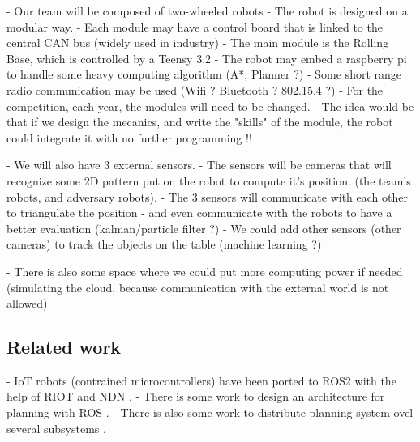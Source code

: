  - Our team will be composed of two-wheeled robots
 - The robot is designed on a modular way.
 - Each module may have a control board that is linked to the central CAN bus (widely used in industry)
 - The main module is the Rolling Base, which is controlled by a Teensy 3.2
 - The robot may embed a raspberry pi to handle some heavy computing algorithm (A*, Planner ?)
 - Some short range radio communication may be used (Wifi ? Bluetooth ? 802.15.4 ?)
 - For the competition, each year, the modules will need to be changed.
 - The idea would be that if we design the mecanics, and write the "skills" of the module, the robot could integrate it with no further programming !!

 - We will also have 3 external sensors.
 - The sensors will be cameras that will recognize some 2D pattern put on the robot to compute it's position. (the team's robots, and adversary robots).
 - The 3 sensors will communicate with each other to triangulate the position
 - and even communicate with the robots to have a better evaluation (kalman/particle filter ?)
 - We could add other sensors (other cameras) to track the objects on the table (machine learning ?)
 
 - There is also some space where we could put more computing power if needed (simulating the cloud, because communication with the external world is not allowed)

\subsection{Related work}



 - IoT robots (contrained microcontrollers) \cite{EWSN-IoT-Robot} have been ported to ROS2 with the help of RIOT and NDN \cite{ACM-ICN-IoT-Robotics}.
 - There is some work to design an architecture for planning with ROS \cite{ROSPlan}.
 - There is also some work to distribute planning system ovel several subsystems \cite{NASA-europa-p2p}.

